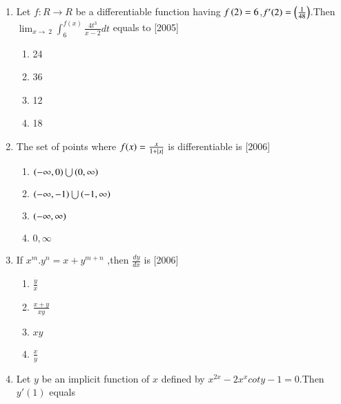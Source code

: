 \documentclass[journal,12pt,twocolumn]{IEEEtran}
\theoremstyle{remark}
\begin{document}
\begin{enumerate}
    \item Let $f:R\rightarrow R$ be a differentiable function having $f\left(2\right)=6$,$f'(2)=\left(\frac{1}{48}\right)$.Then $\lim_{x\to\ 2} \int_{6}^{f(x)} \frac{4t^3}{x-2} dt$ equals to
    \hfill[2005]\break
    \begin{enumerate}
    \item 24
    \item 36
    \item 12
    \item 18\\
    \end{enumerate}
    \item The set of points where $f(x)=\frac{x}{1+\left\vert x\right\vert}$ is differentiable is \hfill[2006]\break
    \begin{enumerate}
    \item $\left(-\infty,0\right)\bigcup\left(0,\infty\right)$
    \item $\left(-\infty,-1\right)\bigcup\left(-1,\infty\right)$
    \item $\left(-\infty,\infty\right)$
    \item ${0,\infty}$\\
    \end{enumerate}
    \item If $x^m.y^n={x+y}^{m+n}$ ,then $\frac{dy}{dx}$ is \hfill[2006]\break
    \begin{enumerate}
    \item $\frac{y}{x}$
    \item $\frac{x+y}{xy}$
    \item $xy$
    \item $\frac{x}{y}$\\
    \end{enumerate}
    \item Let $y$ be an implicit function of $x$ defined by $x^{2x}-2x^xcoty-1=0$.Then $y'(1)$ equals


\end{enumerate}
\end{document}
